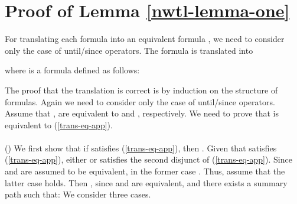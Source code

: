 \documentclass{LMCS}
\theoremstyle{plain}
\theoremstyle{definition}
\begin{document}
\appendix
\section{Proof of Lemma \ref{nwtl-lemma-one}}
\noindent
For translating each  formula  into an equivalent
 formula , we need to consider only the case of
until/since operators. The formula  is translated
into
{\small

}
where  is a formula defined as follows:
{\small

}
The proof that the translation is correct is by induction on the
structure of  formulas. Again we need to consider only the
case of until/since operators. Assume that ,  are
equivalent to  and , respectively. We need
to prove that  is equivalent to (\ref{trans-eq-app}).
\\
\\
() We first show that if 
 satisfies (\ref{trans-eq-app}), then . Given that 
satisfies (\ref{trans-eq-app}), either  or
 satisfies the second disjunct of
(\ref{trans-eq-app}). Since  and  are assumed to be
equivalent, in the former case . Thus, assume that the latter case holds. Then , since  and  are equivalent, and there
exists a summary path  such that:
{\small
}\noindent
We consider three cases. 
\end{document}
